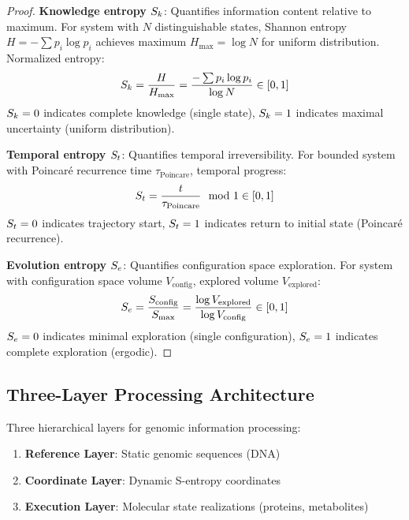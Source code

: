 \begin{proof}
\textbf{Knowledge entropy $S_k$}: Quantifies information content relative to maximum. For system with $N$ distinguishable states, Shannon entropy $H = -\sum p_i \log p_i$ achieves maximum $H_{\text{max}} = \log N$ for uniform distribution. Normalized entropy:
\begin{equation}
S_k = \frac{H}{H_{\text{max}}} = \frac{-\sum p_i \log p_i}{\log N} \in [0,1]
\end{equation}
$S_k = 0$ indicates complete knowledge (single state), $S_k = 1$ indicates maximal uncertainty (uniform distribution).

\textbf{Temporal entropy $S_t$}: Quantifies temporal irreversibility. For bounded system with Poincaré recurrence time $\tau_{\text{Poincare}}$, temporal progress:
\begin{equation}
S_t = \frac{t}{\tau_{\text{Poincare}}} \mod 1 \in [0,1]
\end{equation}
$S_t = 0$ indicates trajectory start, $S_t = 1$ indicates return to initial state (Poincaré recurrence).

\textbf{Evolution entropy $S_e$}: Quantifies configuration space exploration. For system with configuration space volume $V_{\text{config}}$, explored volume $V_{\text{explored}}$:
\begin{equation}
S_e = \frac{S_{\text{config}}}{S_{\text{max}}} = \frac{\log V_{\text{explored}}}{\log V_{\text{config}}} \in [0,1]
\end{equation}
$S_e = 0$ indicates minimal exploration (single configuration), $S_e = 1$ indicates complete exploration (ergodic).
\end{proof}

\subsection{Three-Layer Processing Architecture}

\begin{definition}
\label{def:processing_layers}
Three hierarchical layers for genomic information processing:
\begin{enumerate}
\item \textbf{Reference Layer}: Static genomic sequences (DNA)
\item \textbf{Coordinate Layer}: Dynamic S-entropy coordinates
\item \textbf{Execution Layer}: Molecular state realizations (proteins, metabolites)
\end{enumerate}
\end{definition}

